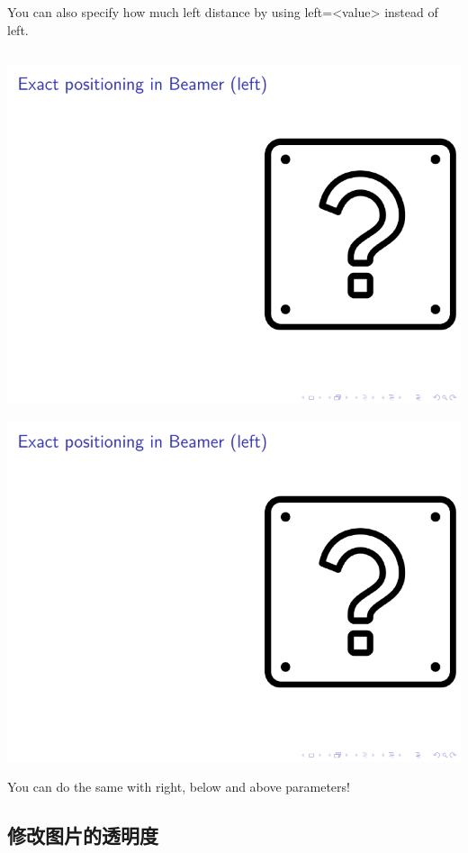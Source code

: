 \begin{column}{0.5\textwidth}
You can also specify how much left distance by using left=<value> instead of left. 

\inputminted[linenos=true]{latex}{examples/beamer/figure-position-with-tikz2.tex}

\includegraphics[page=1]{examples/beamer/figure-position-with-tikz2.pdf}

\includegraphics[page=2]{examples/beamer/figure-position-with-tikz2.pdf}

You can do the same with right, below and above parameters!

\subsection{修改图片的透明度}


\end{column}
